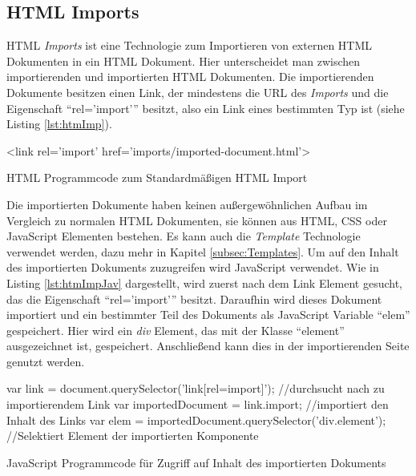 \documentclass[12pt, paper=a4, bibtotoc, toc=listof, headsepline=true, numbers=endperiod]{scrreprt}
\begin{document}
		\subsection{HTML Imports}
		\ac{HTML} \emph{Imports} ist eine Technologie zum Importieren von externen \ac{HTML} Dokumenten in ein \ac{HTML} Dokument. Hier unterscheidet man zwischen importierenden und importierten \ac{HTML} Dokumenten. Die importierenden Dokumente besitzen einen Link, der mindestens die \ac{URL} des \emph{Imports} und die Eigenschaft \enquote{rel='import'} besitzt, also ein Link eines bestimmten Typ ist \cite{Glazkov2016}(siehe Listing \ref{lst:htmImp}). 
		\begin{listing}
			\begin{HTMLcode*}{}
 <link rel='import' href='imports/imported-document.html'>
				\end{HTMLcode*}
			\caption[Standard HTML Import]{HTML Programmcode zum Standardmäßigen HTML Import}
			\label{lst:htmImp}
		\end{listing}\noindent
		Die importierten Dokumente haben keinen außergewöhnlichen Aufbau im Vergleich zu normalen \ac{HTML} Dokumenten, sie können aus \ac{HTML}, \ac{CSS} oder JavaScript Elementen bestehen. Es kann auch die \emph{Template} Technologie verwendet werden, dazu mehr in Kapitel \ref{subsec:Templates}.
		Um auf den Inhalt des importierten Dokuments zuzugreifen wird JavaScript verwendet. Wie in Listing \ref{lst:htmImpJav} dargestellt, wird zuerst nach dem Link Element gesucht, das die Eigenschaft \enquote{rel='import'} besitzt. Daraufhin wird dieses Dokument importiert und ein bestimmter Teil des Dokuments als JavaScript Variable \enquote{elem} gespeichert. Hier wird ein \emph{div} Element, das mit der Klasse \enquote{element} ausgezeichnet ist, gespeichert. Anschließend kann dies in der importierenden Seite genutzt werden. 
		\begin{listing}
			\begin{JavaScriptcode*}{}
var link = document.querySelector('link[rel=import]'); //durchsucht nach zu importierendem Link
var importedDocument = link.import; //importiert den Inhalt des Links
var elem = importedDocument.querySelector('div.element');  //Selektiert Element der importierten Komponente
			\end{JavaScriptcode*}
			\caption[Zugriff auf importiertes Dokument]{JavaScript Programmcode für Zugriff auf Inhalt des importierten Dokuments}
			\label{lst:htmImpJav}
		\end{listing}\noindent 
\end{document}
